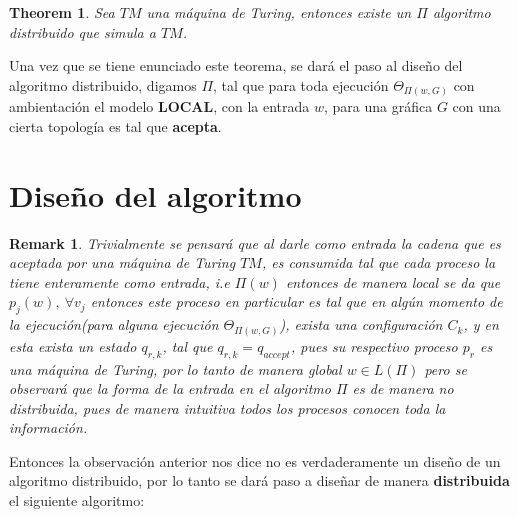 \documentclass[10pt]{report}
\newtheorem*{remark}{Remark}
\newtheorem{theorem}{Theorem}
\begin{document}
    \begin{theorem}
        Sea $TM$ una máquina de Turing, entonces existe un $\Pi$ algoritmo distribuido que simula
        a $TM$.
    \end{theorem}
    Una vez que se tiene enunciado este teorema, se dará el paso al diseño del algoritmo distribuido,
    digamos $\Pi$, tal que para toda ejecución $\Theta_{\Pi(w,G)}$ con ambientación el modelo \textbf{LOCAL}, con la entrada $w$, para una gráfica $G$ con una
    cierta topología es tal que \textbf{acepta}.
    \newpage

    \section{Diseño del algoritmo}\label{sec:diseño-del-algoritmo}
    \begin{remark}
        Trivialmente se pensará que al darle como entrada la cadena que es aceptada por una máquina de Turing $TM$,\space
        es consumida tal que cada proceso la tiene enteramente como entrada, i.e $\Pi(w)$ entonces de manera local se da
        que $p_{j}(w),\ \forall v_{j}$ entonces este proceso en particular es tal que en algún momento de la ejecución(para alguna ejecución $\Theta_{\Pi(w,G)}$),
        exista una configuración $C_{k}$, y en esta exista un estado $q_{r,k}$, tal que $q_{r,k} = q_{accept}$, pues su respectivo proceso $p_{r}$ es una máquina de Turing,
        por lo tanto de manera global $w\in L(\Pi)$ pero se observará que la forma de la entrada en el algoritmo $\Pi$
        es de manera no distribuida, pues de manera intuitiva todos los procesos conocen toda la información.
    \end{remark}
    Entonces la observación anterior nos dice no es verdaderamente un diseño de un algoritmo distribuido, por lo tanto se dará paso a diseñar de manera
    \textbf{distribuida} el siguiente algoritmo:
    \newline
\end{document}
